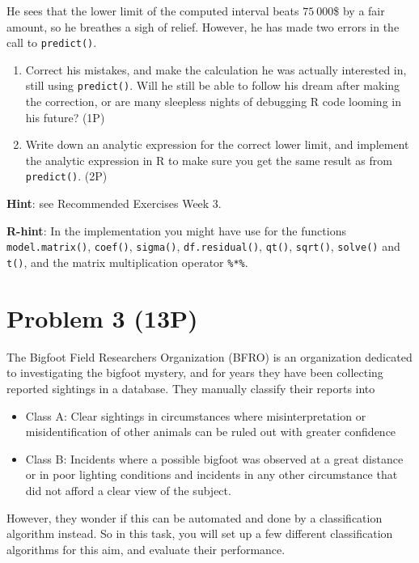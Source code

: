 \documentclass[
]{article}
\providecommand{\tightlist}{%
  \setlength{\itemsep}{0pt}\setlength{\parskip}{0pt}}
\begin{document}
He sees that the lower limit of the computed interval beats
\(75\ 000\)\$ by a fair amount, so he breathes a sigh of relief.
However, he has made two errors in the call to \texttt{predict()}.

\begin{enumerate}
\def\labelenumi{\roman{enumi})}
\item
  Correct his mistakes, and make the calculation he was actually
  interested in, still using \texttt{predict()}. Will he still be able
  to follow his dream after making the correction, or are many sleepless
  nights of debugging R code looming in his future? (1P)
\item
  Write down an analytic expression for the correct lower limit, and
  implement the analytic expression in R to make sure you get the same
  result as from \texttt{predict()}. (2P)
\end{enumerate}

\textbf{Hint}: see Recommended Exercises Week 3.

\textbf{R-hint}: In the implementation you might have use for the
functions \texttt{model.matrix()}, \texttt{coef()}, \texttt{sigma()},
\texttt{df.residual()}, \texttt{qt()}, \texttt{sqrt()}, \texttt{solve()}
and \texttt{t()}, and the matrix multiplication operator \texttt{\%*\%}.

\hypertarget{problem-3-13p}{%
\section{Problem 3 (13P)}\label{problem-3-13p}}

The Bigfoot Field Researchers Organization (BFRO) is an organization
dedicated to investigating the bigfoot mystery, and for years they have
been collecting reported sightings in a database. They manually classify
their reports into

\begin{itemize}
\tightlist
\item
  Class A: Clear sightings in circumstances where misinterpretation or
  misidentification of other animals can be ruled out with greater
  confidence
\item
  Class B: Incidents where a possible bigfoot was observed at a great
  distance or in poor lighting conditions and incidents in any other
  circumstance that did not afford a clear view of the subject.
\end{itemize}

However, they wonder if this can be automated and done by a
classification algorithm instead. So in this task, you will set up a few
different classification algorithms for this aim, and evaluate their
performance.
\end{document}
